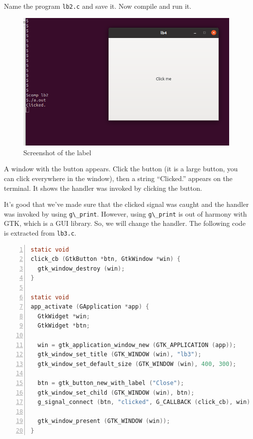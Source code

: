 Name the program \passthrough{\lstinline!lb2.c!} and save it. Now
compile and run it.

\begin{figure}
\centering
\includegraphics[width=11.205cm,height=6.945cm]{../image/screenshot_lb2.png}
\caption{Screenshot of the label}
\end{figure}

A window with the button appears. Click the button (it is a large
button, you can click everywhere in the window), then a string
``Clicked.'' appears on the terminal. It shows the handler was invoked
by clicking the button.

It's good that we've made sure that the clicked signal was caught and
the handler was invoked by using \passthrough{\lstinline!g\_print!}.
However, using \passthrough{\lstinline!g\_print!} is out of harmony with
GTK, which is a GUI library. So, we will change the handler. The
following code is extracted from \passthrough{\lstinline!lb3.c!}.

\begin{lstlisting}[language=C, numbers=left]
static void
click_cb (GtkButton *btn, GtkWindow *win) {
  gtk_window_destroy (win);
}

static void
app_activate (GApplication *app) {
  GtkWidget *win;
  GtkWidget *btn;

  win = gtk_application_window_new (GTK_APPLICATION (app));
  gtk_window_set_title (GTK_WINDOW (win), "lb3");
  gtk_window_set_default_size (GTK_WINDOW (win), 400, 300);

  btn = gtk_button_new_with_label ("Close");
  gtk_window_set_child (GTK_WINDOW (win), btn);
  g_signal_connect (btn, "clicked", G_CALLBACK (click_cb), win);

  gtk_window_present (GTK_WINDOW (win));
}
\end{lstlisting}

